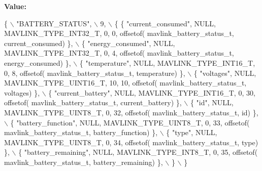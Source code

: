 {\bfseries Value\+:}
\begin{DoxyCode}
\{ \(\backslash\)
    \textcolor{stringliteral}{"BATTERY\_STATUS"}, \(\backslash\)
    9, \(\backslash\)
    \{  \{ \textcolor{stringliteral}{"current\_consumed"}, NULL, MAVLINK_TYPE_INT32_T, 0, 0, offsetof(
      mavlink_battery_status_t, current\_consumed) \}, \(\backslash\)
         \{ \textcolor{stringliteral}{"energy\_consumed"}, NULL, MAVLINK_TYPE_INT32_T, 0, 4, offsetof(
      mavlink_battery_status_t, energy\_consumed) \}, \(\backslash\)
         \{ \textcolor{stringliteral}{"temperature"}, NULL, MAVLINK_TYPE_INT16_T, 0, 8, offsetof(
      mavlink_battery_status_t, temperature) \}, \(\backslash\)
         \{ \textcolor{stringliteral}{"voltages"}, NULL, MAVLINK_TYPE_UINT16_T, 10, 10, offsetof(
      mavlink_battery_status_t, voltages) \}, \(\backslash\)
         \{ \textcolor{stringliteral}{"current\_battery"}, NULL, MAVLINK_TYPE_INT16_T, 0, 30, offsetof(
      mavlink_battery_status_t, current\_battery) \}, \(\backslash\)
         \{ \textcolor{stringliteral}{"id"}, NULL, MAVLINK_TYPE_UINT8_T, 0, 32, offsetof(
      mavlink_battery_status_t, \textcolor{keywordtype}{id}) \}, \(\backslash\)
         \{ \textcolor{stringliteral}{"battery\_function"}, NULL, MAVLINK_TYPE_UINT8_T, 0, 33, offsetof(
      mavlink_battery_status_t, battery\_function) \}, \(\backslash\)
         \{ \textcolor{stringliteral}{"type"}, NULL, MAVLINK_TYPE_UINT8_T, 0, 34, offsetof(
      mavlink_battery_status_t, type) \}, \(\backslash\)
         \{ \textcolor{stringliteral}{"battery\_remaining"}, NULL, MAVLINK_TYPE_INT8_T, 0, 35, offsetof(
      mavlink_battery_status_t, battery\_remaining) \}, \(\backslash\)
         \} \(\backslash\)
\}
\end{DoxyCode}
\mbox{\label{mavlink__msg__battery__status_8h_a65f013f4b2cb3208b981dded065953da}} 
